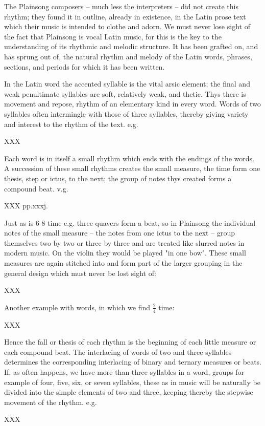 The Plainsong composers -- much less the interpreters -- did not create this rhythm; they found it in outline, already in existence, in the Latin prose text which their music is intended to clothe and adorn. We must never lose sight of the fact that Plainsong is vocal Latin music, for this is the key to the understanding of its rhythmic and melodic structure. It has been grafted on, and has sprung out of, the natural rhythm and melody of the Latin words, phrases, sections, and periods for which it has been written.

In the Latin word the accented syllable is the vital arsic element; the final and weak penultimate syllables are soft, relatively weak, and thetic. Thys there is movement and repose, rhythm of an elementary kind in every word. Words of two syllables often intermingle with those of three syllables, thereby giving variety and interest to the rhythm of the text. e.g.

XXX

Each word is in itself a small rhythm which ends with the endings of the words. A succession of these small rhythms creates the small measure, the time form one thesis, step or ictus, to the next; the group of notes thys created forms a compound beat. v.g.

XXX pp.xxxj.


Just as is 6-8 time e.g. three quavers form a beat, so in Plainsong the individual notes of the small measure -- the notes from one ictus to the next -- group themselves two by two or three by three and are treated like slurred notes in modern music. On the violin they would be played "in one bow". These small measures are again stitched into and form part of the larger grouping in the general design which must never be lost sight of:

XXX

Another example with words, in which we find $\frac{2}{4}$ time:

XXX

Hence the fall or thesis of each rhythm is the beginning of each little measure or each compound beat. The interlacing of words of two and three syllables determines the corresponding interlacing of binary and ternary measures or beats. If, as often happens, we have more than three syllables in a word, groups for example of four, five, six, or seven syllables, these as in music will be naturally be divided into the simple elements of two and three, keeping thereby the stepwise movement of the rhythm. e.g. 

XXX

